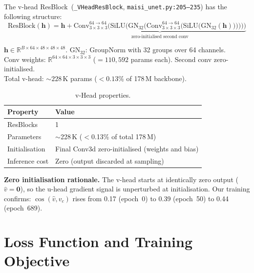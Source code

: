 \documentclass[11pt,a4paper]{article}
\newcommand{\code}[1]{\texttt{#1}}
\begin{document}
The v-head ResBlock~(\code{\_VHeadResBlock}, \code{maisi\_unet.py:205--235})
has the following structure:
\begin{equation}
  \mathrm{ResBlock}(\mathbf{h})
    = \mathbf{h}
      + \underbrace{
          \mathrm{Conv}_{3 \times 3 \times 3}^{64 \to 64}\bigl(
            \mathrm{SiLU}\bigl(
              \mathrm{GN}_{32}\bigl(
                \mathrm{Conv}_{3 \times 3 \times 3}^{64 \to 64}\bigl(
                  \mathrm{SiLU}\bigl(\mathrm{GN}_{32}(\mathbf{h})\bigr)
                \bigr)
              \bigr)
            \bigr)
          \bigr)
        }_{\text{zero-initialised second conv}}
  \label{eq:vhead_resblock}
\end{equation}
\begin{shapes}
$\mathbf{h} \in \mathbb{R}^{B \times 64 \times 48 \times 48 \times 48}$.
\quad $\mathrm{GN}_{32}$: GroupNorm with 32 groups over 64 channels.\\
Conv weights: $\mathbb{R}^{64 \times 64 \times 3 \times 3 \times 3}$
($= 110{,}592$ params each). Second conv zero-initialised.\\
Total v-head: ${\sim}228$\,K params ($<0.13\%$ of 178\,M backbone).
\end{shapes}

\begin{table}[ht]
\centering
\caption{v-Head properties.}
\label{tab:vhead}
\begin{tabular}{ll}
\toprule
\textbf{Property}   & \textbf{Value} \\
\midrule
ResBlocks            & 1 \\
Parameters           & ${\sim}$228\,K ($<$0.13\% of total 178\,M) \\
Initialisation       & Final Conv3d zero-initialised (weights and bias) \\
Inference cost       & Zero (output discarded at sampling) \\
\bottomrule
\end{tabular}
\end{table}

\textbf{Zero initialisation rationale.}  The v-head starts at identically zero
output ($\hat{v} = \mathbf{0}$), so the u-head gradient signal is unperturbed
at initialisation.  Our training confirms:
$\cos(\hat{v},v_c)$ rises from 0.17 (epoch~0) to 0.39 (epoch~50) to 0.44
(epoch~689).


\section{Loss Function and Training Objective}
\label{sec:loss}
\end{document}
